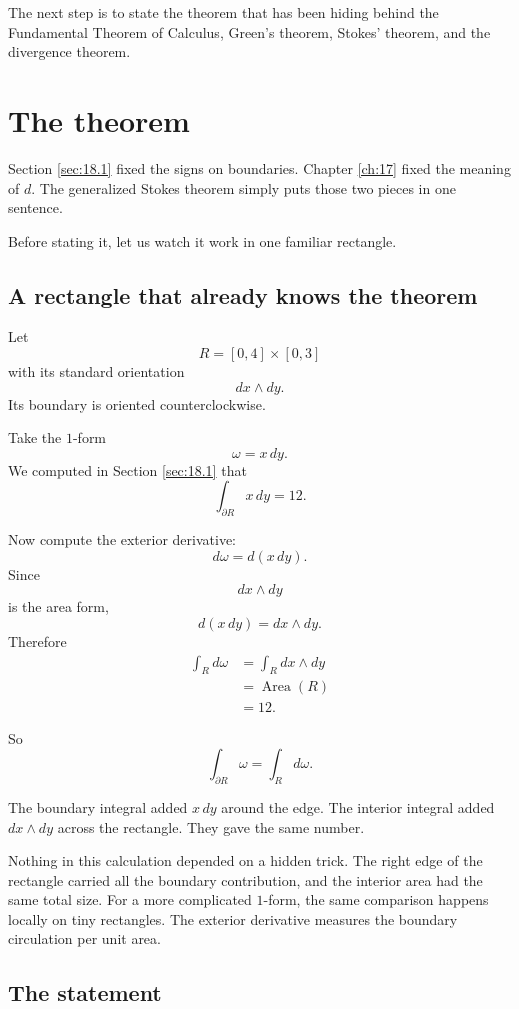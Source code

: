 The next step is to state the theorem that has been hiding behind the Fundamental
Theorem of Calculus, Green's theorem, Stokes' theorem, and the divergence theorem.

\section{The theorem}
\label{sec:18.2}

Section \ref{sec:18.1} fixed the signs on boundaries.  Chapter \ref{ch:17} fixed the
meaning of \(d\).  The generalized Stokes theorem simply puts those two pieces in one
sentence.

Before stating it, let us watch it work in one familiar rectangle.

\subsection{A rectangle that already knows the theorem}

Let
\[
    R=[0,4]\times[0,3]
\]
with its standard orientation
\[
    dx\wedge dy.
\]
Its boundary is oriented counterclockwise.

Take the \(1\)-form
\[
    \omega=x\,dy.
\]
We computed in Section \ref{sec:18.1} that
\[
    \int_{\partial R} x\,dy=12.
\]

Now compute the exterior derivative:
\[
    d\omega=d(x\,dy).
\]
Since
\[
    dx\wedge dy
\]
is the area form,
\[
    d(x\,dy)=dx\wedge dy.
\]
Therefore
\[
\begin{aligned}
    \int_R d\omega
    &=
    \int_R dx\wedge dy\\
    &=
    \operatorname{Area}(R)\\
    &=
    12.
\end{aligned}
\]

So
\[
\boxed{
    \int_{\partial R}\omega=\int_R d\omega.
}
\]

The boundary integral added \(x\,dy\) around the edge.  The interior integral added
\(dx\wedge dy\) across the rectangle.  They gave the same number.

Nothing in this calculation depended on a hidden trick.  The right edge of the rectangle
carried all the boundary contribution, and the interior area had the same total size.
For a more complicated \(1\)-form, the same comparison happens locally on tiny
rectangles.  The exterior derivative measures the boundary circulation per unit area.

\subsection{The statement}

